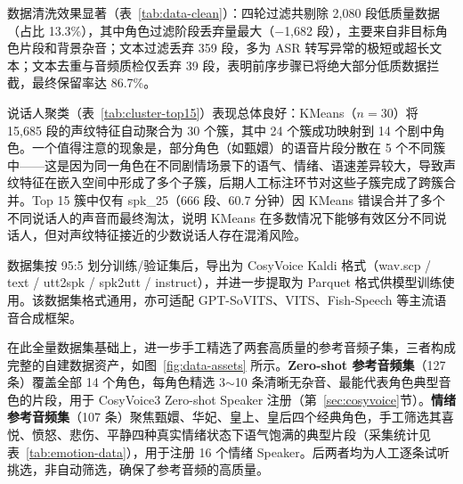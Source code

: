 \documentclass[12pt,a4paper]{article}
\begin{document}
数据清洗效果显著（表~\ref{tab:data-clean}）：四轮过滤共剔除 2,080 段低质量数据（占比 13.3\%），其中角色过滤阶段丢弃量最大（$-$1,682 段），主要来自非目标角色片段和背景杂音；文本过滤丢弃 359 段，多为 ASR 转写异常的极短或超长文本；文本去重与音频质检仅丢弃 39 段，表明前序步骤已将绝大部分低质数据拦截，最终保留率达 86.7\%。

说话人聚类（表~\ref{tab:cluster-top15}）表现总体良好：KMeans（$n=30$）将 15,685 段的声纹特征自动聚合为 30 个簇，其中 24 个簇成功映射到 14 个剧中角色。一个值得注意的现象是，部分角色（如甄嬛）的语音片段分散在 5 个不同簇中——这是因为同一角色在不同剧情场景下的语气、情绪、语速差异较大，导致声纹特征在嵌入空间中形成了多个子簇，后期人工标注环节对这些子簇完成了跨簇合并。Top 15 簇中仅有 spk\_25（666 段、60.7 分钟）因 KMeans 错误合并了多个不同说话人的声音而最终淘汰，说明 KMeans 在多数情况下能够有效区分不同说话人，但对声纹特征接近的少数说话人存在混淆风险。

数据集按 95:5 划分训练/验证集后，导出为 CosyVoice Kaldi 格式（wav.scp / text / utt2spk / spk2utt / instruct），并进一步提取为 Parquet 格式供模型训练使用。该数据集格式通用，亦可适配 GPT-SoVITS、VITS、Fish-Speech 等主流语音合成框架。

在此全量数据集基础上，进一步手工精选了两套高质量的参考音频子集，三者构成完整的自建数据资产，如图~\ref{fig:data-assets} 所示。\textbf{Zero-shot 参考音频集}（127 条）覆盖全部 14 个角色，每角色精选 3$\sim$10 条清晰无杂音、最能代表角色典型音色的片段，用于 CosyVoice3 Zero-shot Speaker 注册（第~\ref{sec:cosyvoice}节）。\textbf{情绪参考音频集}（107 条）聚焦甄嬛、华妃、皇上、皇后四个经典角色，手工筛选其喜悦、愤怒、悲伤、平静四种真实情绪状态下语气饱满的典型片段（采集统计见表~\ref{tab:emotion-data}），用于注册 16 个情绪 Speaker。后两者均为人工逐条试听挑选，非自动筛选，确保了参考音频的高质量。
\end{document}
